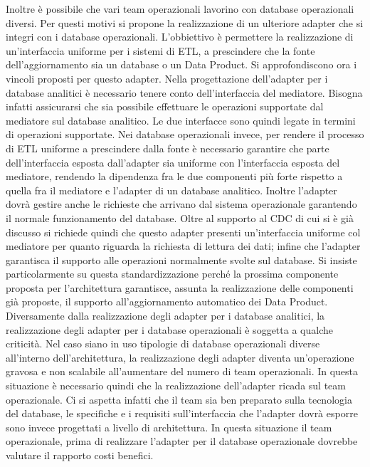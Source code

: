 \documentclass[a4paper,12pt]{report}
\begin{document}
Inoltre è possibile che vari team operazionali lavorino con database operazionali diversi. 
Per questi motivi si propone la realizzazione di un ulteriore  adapter che si integri con i database operazionali.
L'obbiettivo è permettere la realizzazione di un'interfaccia uniforme per i sistemi di ETL, a prescindere che la fonte dell'aggiornamento sia un database o un Data Product.
Si approfondiscono ora i vincoli proposti per questo adapter.
Nella progettazione dell'adapter per i database analitici è necessario tenere conto dell'interfaccia del mediatore. 
Bisogna infatti assicurarsi che sia possibile effettuare le operazioni supportate dal mediatore sul database analitico.
Le due interfacce sono quindi legate in termini di operazioni supportate.
Nei database operazionali invece, per rendere il processo di ETL uniforme a prescindere dalla fonte è necessario garantire che parte dell'interfaccia esposta dall'adapter sia uniforme con l'interfaccia esposta del mediatore, rendendo la dipendenza fra le due componenti più forte rispetto a quella fra il mediatore e l'adapter di un database analitico.
Inoltre l'adapter dovrà gestire anche le richieste che arrivano dal sistema operazionale garantendo il normale funzionamento del database.
Oltre al supporto al CDC di cui si è già discusso si richiede quindi che questo adapter presenti un'interfaccia uniforme col mediatore per quanto riguarda la richiesta di lettura dei dati; infine che l'adapter garantisca il supporto alle operazioni normalmente svolte sul database.
Si insiste particolarmente su questa standardizzazione perché la prossima componente proposta per l'architettura garantisce, assunta la realizzazione delle componenti già proposte, il supporto all'aggiornamento automatico dei Data Product.
Diversamente dalla realizzazione degli adapter per i database analitici, la realizzazione degli adapter per i database operazionali è soggetta a qualche criticità.
Nel caso siano in uso tipologie di database operazionali diverse all'interno dell'architettura, la realizzazione degli adapter diventa un'operazione gravosa e non scalabile all'aumentare del numero di team operazionali.
In questa situazione è necessario quindi che la realizzazione dell'adapter ricada sul team operazionale.
Ci si aspetta infatti che il team sia ben preparato sulla tecnologia del database, le specifiche e i requisiti sull'interfaccia che l'adapter dovrà esporre sono invece progettati a livello di architettura.
In questa situazione il team operazionale, prima di realizzare l'adapter per il database operazionale dovrebbe valutare il rapporto costi benefici.
\end{document}
